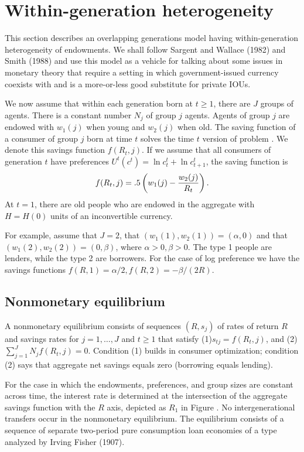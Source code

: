   
\section{Within-generation heterogeneity}\label{sec:realbills}%
This section describes an overlapping generations
model having within-generation heterogeneity of
endowments.  We shall follow Sargent and Wallace  (1982)
and Smith (1988)
and use this model as a vehicle for talking about some
issues  in monetary theory that  require  a setting
in which government-issued  currency coexists with and is a more-or-less
 good substitute for
private IOUs.

We now assume  that
within each generation born at $t  \geq 1$,
there are $J$ groups of agents. There
is a constant number $N_j$ of group $j$ agents.  Agents of group
$j$ are endowed with $w_1(j)$ when young and
$w_2(j)$ when old.  The saving function
of a consumer of group $j$ born at time $t$
solves the time $t$ version of  problem
.    We denote this savings
function $f(R_t,j)$. If we  assume that all
consumers of generation $t$  have
preferences  $U^t(c^t) = \ln c_t^t + \ln c^t_{t+1}$,
the saving function is
$$ f(R_t,j) = .5\left( w_1(j) - {w_2(j)  \over R_t} \right).$$
At $t=1$, there are old people who are endowed in
the aggregate with $H = H(0)$ units of an inconvertible currency.

For example, assume that $J=2$, that $(w_1(1), w_2(1))  =
 (\alpha, 0)$ and that $
(w_1(2), w_2(2))   = (0,  \beta)$, where $\alpha >0, \beta >0$.
The type 1 people are lenders, while the type 2 are borrowers.
For the case of log preference we have the savings
functions
$f(R,1) = \alpha /2, f(R,2) = - \beta/(2R)$.

\subsection{Nonmonetary equilibrium}

A nonmonetary equilibrium consists of sequences $(R, s_j)$ of rates of return $R$
and savings rates for  $j= 1, \ldots , J$  and $t \geq 1$ that satisfy
(1)$ s_{tj} = f(R_t, j)$, and (2)
$ \sum_{j=1}^J N_j f(R_t, j) =0   .$
Condition (1) builds in consumer optimization; condition
(2) says that aggregate net savings equals zero (borrowing
equals lending).

 For the case in which the endowments, preferences, and group
sizes are constant across time, the interest rate is determined
at the intersection of the aggregate savings function
with the $R$ axis, depicted as $R_1$ in Figure . %
 No intergenerational   transfers occur in the nonmonetary
equilibrium.  The equilibrium consists of a sequence of separate
 two-period pure consumption loan economies of a type
analyzed by Irving Fisher (1907).

